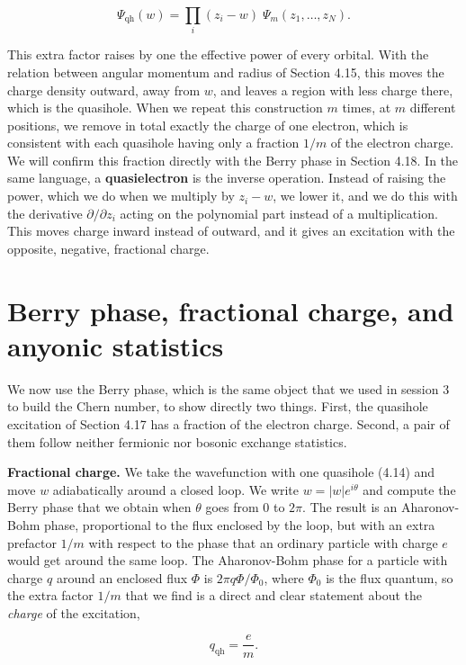 \begin{equation}
\Psi_{\text{qh}}(w) = \prod_i (z_i-w) \; \Psi_m(z_1,\dots,z_N).
\end{equation}

This extra factor raises by one the effective power of every orbital. With the relation between
angular momentum and radius of Section 4.15, this moves the charge density outward, away from $w$,
and leaves a region with less charge there, which is the quasihole. When we repeat this
construction $m$ times, at $m$ different positions, we remove in total exactly the charge of one
electron, which is consistent with each quasihole having only a fraction $1/m$ of the electron
charge. We will confirm this fraction directly with the Berry phase in Section 4.18. In the same
language, a \textbf{quasielectron} is the inverse operation. Instead of raising the power, which
we do when we multiply by $z_i-w$, we lower it, and we do this with the derivative $\partial/\partial z_i$
acting on the polynomial part instead of a multiplication. This moves charge inward instead of outward, and it gives an
excitation with the opposite, negative, fractional charge.

\section{Berry phase, fractional charge, and anyonic statistics}

We now use the Berry phase, which is the same object that we used in session 3 to build the Chern
number, to show directly two things. First, the quasihole excitation of Section 4.17 has a fraction
of the electron charge. Second, a pair of them follow neither fermionic nor bosonic exchange
statistics.

\textbf{Fractional charge.} We take the wavefunction with one quasihole (4.14) and move $w$
adiabatically around a closed loop. We write $w=|w|e^{i\theta}$ and compute the Berry phase that
we obtain when $\theta$ goes from $0$ to $2\pi$. The result is an Aharonov-Bohm phase,
proportional to the flux enclosed by the loop, but with an extra prefactor $1/m$ with respect to
the phase that an ordinary particle with charge $e$ would get around the same loop. The
Aharonov-Bohm phase for a particle with charge $q$ around an enclosed flux $\Phi$ is $2\pi
q\Phi/\Phi_0$, where $\Phi_0$ is the flux quantum, so the extra factor $1/m$ that we find is a
direct and clear statement about the \emph{charge} of the excitation,

\begin{equation}
q_{\text{qh}} = \frac{e}{m}.
\end{equation}

